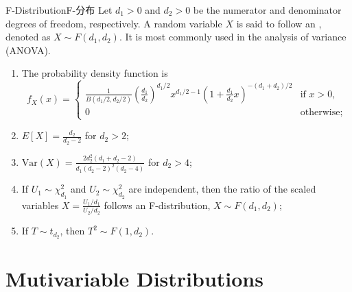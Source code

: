 \documentclass[../main.tex]{subfiles}
\begin{document}
\begin{proposition}{F-Distribution}{F-分布}
Let $d_1 > 0$ and $d_2 > 0$ be the numerator and denominator degrees of freedom, respectively. A random variable $X$ is said to follow an , denoted as $X \sim F(d_1, d_2)$. It is most commonly used in the analysis of variance (ANOVA).
\begin{enumerate}
\item The probability density function is
$$f_X(x) = 
\begin{cases} 
\frac{1}{B(d_1/2, d_2/2)} \left(\frac{d_1}{d_2}\right)^{d_1/2} x^{d_1/2 - 1} \left(1 + \frac{d_1}{d_2}x\right)^{-(d_1+d_2)/2} & \text{if } x > 0, \\
0 & \text{otherwise};
\end{cases}$$
\item $E[X] = \frac{d_2}{d_2-2}$ for $d_2 > 2$;
\item $\text{Var}(X) = \frac{2d_2^2(d_1+d_2-2)}{d_1(d_2-2)^2(d_2-4)}$ for $d_2 > 4$;
\item If $U_1 \sim \chi^2_{d_1}$ and $U_2 \sim \chi^2_{d_2}$ are independent, then the ratio of the scaled variables $X = \frac{U_1/d_1}{U_2/d_2}$ follows an F-distribution, $X \sim F(d_1, d_2)$;
\item If $T \sim t_{d_2}$, then $T^2 \sim F(1, d_2)$.
\end{enumerate}
\end{proposition}

\section{Mutivariable Distributions}
\end{document}

